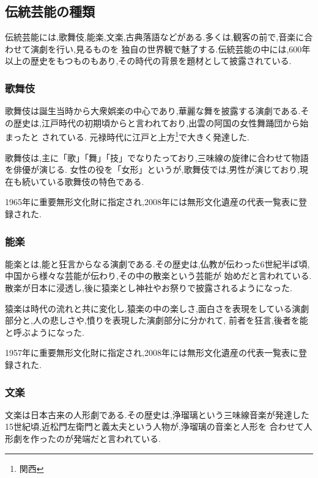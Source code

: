 \documentclass[12pt]{ltjsarticle}
\begin{document}
\subsection{伝統芸能の種類}
伝統芸能には,歌舞伎,能楽,文楽,古典落語などがある.多くは,観客の前で,音楽に合わせて演劇を行い,見るものを
独自の世界観で魅了する.伝統芸能の中には,600年以上の歴史をもつものもあり,その時代の背景を題材として披露されている.


\subsubsection{歌舞伎}
歌舞伎は誕生当時から大衆娯楽の中心であり,華麗な舞を披露する演劇である.その歴史は,江戸時代の初期頃からと言われており,出雲の阿国の女性舞踊団から始まったと
されている\cite{kabuki}.
元禄時代に江戸と上方\footnote{関西}で大きく発達した.

歌舞伎は,主に「歌」「舞」「技」でなりたっており,三味線の旋律に合わせて物語を俳優が演じる.
女性の役を「女形」というが,歌舞伎では,男性が演じており,現在も続いている歌舞伎の特色である.

1965年に重要無形文化財に指定され,2008年には無形文化遺産の代表一覧表に登録された.






\subsubsection{能楽}
能楽とは,能と狂言からなる演劇である.その歴史は,仏教が伝わった6世紀半ば頃,中国から様々な芸能が伝わり,その中の散楽という芸能が
始めだと言われている.散楽が日本に浸透し,後に猿楽とし神社やお祭りで披露されるようになった\cite{nou}.

猿楽は時代の流れと共に変化し,猿楽の中の楽しさ,面白さを表現をしている演劇部分と,人の悲しさや,憤りを表現した演劇部分に分かれて,
前者を狂言,後者を能と呼ぶようになった.

1957年に重要無形文化財に指定され,2008年には無形文化遺産の代表一覧表に登録された.





\subsubsection{文楽}
文楽は日本古来の人形劇である.その歴史は,浄瑠璃という三味線音楽が発達した15世紀頃,近松門左衛門と義太夫という人物が,浄瑠璃の音楽と人形を
合わせて人形劇を作ったのが発端だと言われている\cite{bun}.
\end{document}
